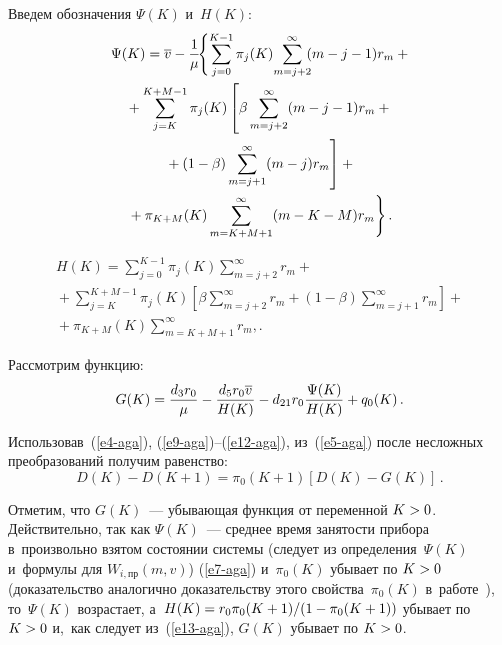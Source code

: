 \begin{multicols}{2}
  Введем обозначения $\Psi(K)$ и~$H(K)$:
  \begin{multline*}
  \Psi(K) =\overline{v}-\fr{1}{\mu}\! \Bigg\{\! \sum\limits_{j=0}^{K-1} \pi_j(K) 
\!\sum\limits^\infty_{m=j+2}\!\! (m-j-1)r_m+{}\!%
\\
  {}+\sum\limits_{j=K}^{K+M-1} \pi_j(K) \left[ \beta \sum\limits^\infty_{m=j+2} 
(m-j-1)r_m +{}\right.\\
\left.{}+(1-\beta)\sum\limits^\infty_{m=j+1} (m-j)r_m\right]+{}\\
{}+ \pi_{K+M}(K) \sum\limits^\infty_{m=K+M+1} (m-K-M) r_m\Bigg\}\,.
  \end{multline*}
  
  \vspace*{-12pt}
  
  \noindent
  \begin{multline*}
  H(K) =\sum\limits^{K-1}_{j=0} \! \pi_j(K) \sum\limits^\infty_{m=j+2} \! r_m + {}\\
  {}+
\sum\limits_{j=K}^{K+M-1} \! \pi_j (K) \left[ \beta \sum\limits^\infty_{m=j+2} \! 
r_m +(1-\beta)\sum\limits^\infty_{m=j+1}\! r_m\right]+{}\\
  {}+\pi_{K+M}(K)\sum\limits^\infty_{m=K+M+1}\! r_m,.
  \end{multline*} 



Рассмотрим функцию:
\begin{equation}
G(K)=\displaystyle\frac{\displaystyle d_3r_0\mathstrut}{\displaystyle \mu\mathstrut} - \displaystyle\frac{\displaystyle d_5r_0\overline{v}\mathstrut}{\displaystyle H(K)\mathstrut}-d_{21} 
r_0\displaystyle\frac{\displaystyle \Psi(K)\mathstrut}{\displaystyle H(K)\mathstrut}+q_0(K)\,.
\label{e13-aga}
\end{equation}
  
  Использовав~(\ref{e4-aga}), (\ref{e9-aga})--(\ref{e12-aga}), из~(\ref{e5-aga}) 
после несложных преобразований получим равенство:
  \begin{equation}
  D(K)-D(K+1)=\pi_0(K+1) [D(K)-G(K)]\,.
  \label{e14-aga}
  \end{equation} 

  Отметим, что $G(K)$~--- убывающая функция от переменной $K\hm>0$. 
Действительно, так как $\Psi(K)$~--- среднее время занятости прибора 
в~произвольно взятом состоянии системы (следует из определения~$\Psi(K)$ 
и~формулы для $W_{i,\mathrm{пр}}(m,v)$) (\ref{e7-aga}) и~$\pi_0(K)$\linebreak 
убывает по $K\hm>0$ (доказательство аналогично доказательству этого 
свойства~$\pi_0(K)$ в~работе~\cite{7-aga}), то~$\Psi(K)$ возрастает, 
а~$H(K)\hm= r_0\pi_0(K+1)/(1\hm-\pi_0(K+1))$ убывает по $K\hm>0$ 
и,~как следует из~(\ref{e13-aga}), $G(K)$ убывает по $K\hm>0$.


\end{multicols}
